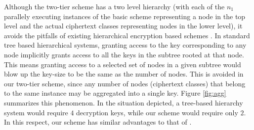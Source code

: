 Although the two-tier scheme has a two level hierarchy (with each of the $n_1$ parallely executing instances of the basic scheme representing a node in the top level and the actual ciphertext classes representing nodes in the lower level), it avoids the pitfalls of existing hierarchical encryption based schemes \cite{akl1983cryptographic,ateniese2012provably}. In standard tree based hierarchical systems, granting access to the key corresponding to any node implicitly grants access to all the keys in the subtree rooted at that node. This means granting access to a selected set of nodes in a given subtree would blow up the key-size to be the same as the number of nodes. This is avoided in our two-tier scheme, since any number of nodes (ciphertext classes) that belong to the same instance may be aggregated into a single key. Figure \ref{fig:agg} summarizes this phenomenon. In the situation depicted, a tree-based hierarchy system would require $4$ decryption keys, while our 
scheme would require only $2$. In this respect, our scheme has similar advantages to that of \cite{chu2014key}.











